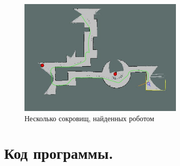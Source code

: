 \documentclass[14pt, a4paper]{extarticle}
\begin{document}
	\begin{figure}[h]
		\centering
		\includegraphics[width=0.7\textwidth]{exp2}
		\caption{Несколько сокровищ, найденных роботом}
		\label{fig:mesh2}
	\end{figure}

	\clearpage
	\section{Код программы.}
\end{document}
